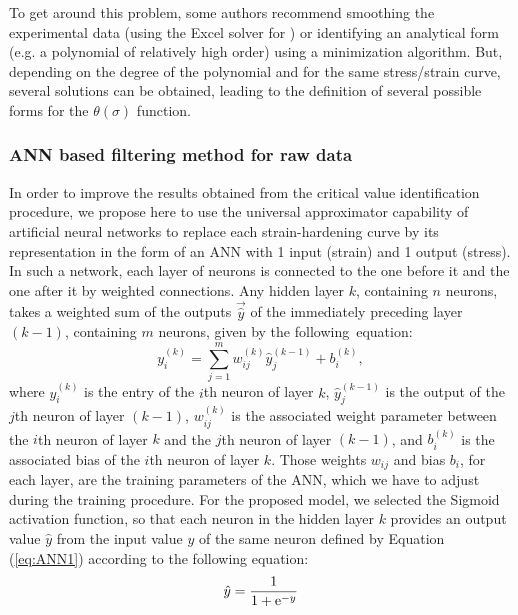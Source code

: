 \documentclass[metals,article,submit,pdftex,moreauthors]{Definitions/mdpi}
\DeclareRobustCommand{\e}[1]{{\rm e}^{#1}}
\DeclareRobustCommand{\lay}[1]{^{(#1)}}
\begin{document}
To get around this problem, some authors recommend smoothing the experimental data (using the Excel solver for \cite{Najafizadeh-2006}) or identifying an analytical form (e.g. a polynomial of relatively high order) using a minimization algorithm.
But, depending on the degree of the polynomial and for the same stress/strain curve, several solutions can be obtained, leading to the definition of several possible forms for the $\theta(\sigma)$ function.

\subsubsection{ANN based filtering method for raw data\label{subsec:ANNbasics}}
In order to improve the results obtained from the critical value identification procedure, we propose here to use the universal approximator capability of artificial neural networks to replace each strain-hardening curve by its representation in the form of an ANN with 1 input (strain) and 1 output (stress).
In such a network, each layer of neurons is connected to the one before it and the one after it by weighted connections.
Any hidden layer $k$, containing $n$ neurons, takes a weighted sum of the outputs $\overrightarrow{\hat{y}}$ of the immediately preceding layer $(k-1)$, containing $m$ neurons, given by the following~equation:
\begin{equation}
y_i\lay{k} = \sum_{j=1}^m w_{ij}\lay{k} \hat{y}_j^{(k-1)}+ b_i\lay{k},\label{eq:ANN1}
\end{equation}
where $y_i\lay{k}$ is the entry of the  $i$th neuron of layer $k$, $\hat{y}_j\lay{k-1}$ is the output of the $j$th neuron of layer $(k-1)$, $w_{ij}\lay{k}$ is the associated weight parameter between the  $i$th neuron of layer $k$ and the  $j$th neuron of layer $(k-1)$, and $b_i\lay{k}$ is the associated bias of the  $i$th neuron of layer $k$.
Those weights $w_{ij}$ and bias $b_i$, for each layer, are the training parameters of the ANN, which we have to adjust during the training procedure.
For the proposed model, we selected the Sigmoid activation function, so that each neuron in the hidden layer $k$ provides an output value ${\hat{y}}$ from the input value $y$ of the same neuron defined by Equation (\ref{eq:ANN1}) according to the following equation:
\begin{equation}
\hat{y}=\frac{1}{1 + \e{-y}}\label{eq:ANN2}
\end{equation}
\end{document}
